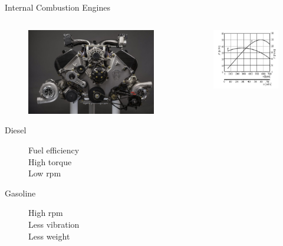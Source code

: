 \documentclass[
svgnames,
handout,
10pt,
]{beamer}
\begin{document}
\begin{frame}{Internal Combustion Engines}
  \begin{columns}
    \begin{column}{0.5\textwidth}
      \begin{figure}[htbp]
        \centering
        \includegraphics[width=\textwidth]{engine}
      \end{figure}
      \begin{description}
      \item[Diesel] Fuel efficiency \\
        High torque \\
        Low rpm
      \item [Gasoline] High rpm \\
        Less vibration \\
        Less weight
      \end{description}
    \end{column}
    \begin{column}{0.5\textwidth}
      \begin{figure}[htbp]
        \centering
        \includegraphics[width=\textwidth]{power-torque-rpm}

\end{figure}
\end{column}
\end{columns}
\end{frame}
\end{document}
